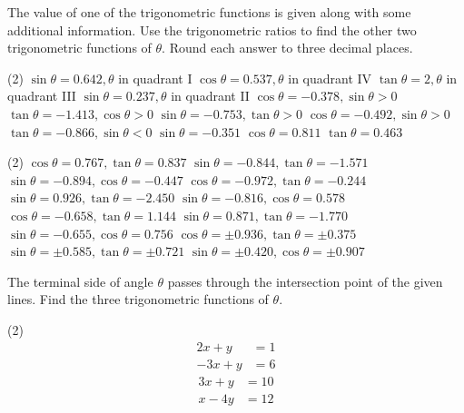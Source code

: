 \documentclass[12pt,fleqn]{book}
\newcommand{\prb}[1]{\begin{Exercise}\parbox[t]{\textwidth-5em}{#1}\end{Exercise}}
\newcommand{\sol}[1]{\begin{Answer}\parbox[t]{\textwidth-5em}{#1}\end{Answer}}
\begin{document}
\prb{
	The value of one of the trigonometric functions is given along with some additional information. Use the trigonometric ratios to find the other two trigonometric functions of $\theta$. Round each answer to three decimal places.
	\begin{tasks}(2)
		\task $\sin \theta=0.642, \theta$ in quadrant I
		\vspace{4em}
		\task $\cos \theta=0.537, \theta$ in quadrant IV
		\vspace{4em}
		\task $\tan \theta=2, \theta$ in quadrant III
		\vspace{4em}
		\task $\sin \theta=0.237, \theta$ in quadrant II
		\vspace{4em}
		\task $\cos \theta=-0.378, \sin \theta>0$
		\vspace{4em}
		\task $\tan \theta=-1.413, \cos \theta>0$
		\vspace{4em}
		\task $\sin \theta=-0.753, \tan \theta>0$
		\vspace{4em}
		\task $\cos \theta=-0.492, \sin \theta>0$
		\vspace{4em}
		\task $\tan \theta=-0.866, \sin \theta<0$
		\vspace{4em}
		\task $\sin \theta=-0.351$
		\vspace{4em}
		\task $\cos \theta=0.811$
		\vspace{4em}
		\task $\tan \theta=0.463$
		\vspace{4em}
	\end{tasks}
}
\sol{
	\begin{tasks}(2)
		\task $\cos \theta=0.767, \tan \theta=0.837$
		\task $\sin \theta=-0.844, \tan \theta=-1.571$
		\task $\sin \theta=-0.894, \cos \theta=-0.447$
		\task $\cos \theta=-0.972, \tan \theta=-0.244$
		\task $\sin \theta=0.926, \tan \theta=-2.450$
		\task $\sin \theta=-0.816, \cos \theta=0.578$
		\task $\cos \theta=-0.658, \tan \theta=1.144$
		\task $\sin \theta=0.871, \tan \theta=-1.770$
		\task $\sin \theta=-0.655, \cos \theta=0.756$
		\task $\cos \theta=\pm 0.936, \tan \theta=\pm 0.375$
		\task $\sin \theta=\pm 0.585, \tan \theta=\pm 0.721$
		\task $\sin \theta=\pm 0.420, \cos \theta=\pm 0.907$
	\end{tasks}
}
\prb{
	The terminal side of angle $\theta$ passes through the intersection point of the given lines. Find the three trigonometric functions of $\theta$.
	\begin{tasks}(2)
		\task \vspace{-2.1em}
		\begin{align*}
			2 x+y  & =1 \\
			-3 x+y & =6
		\end{align*}
		\task \vspace{-2.1em}
		\begin{align*}
			3 x+y & =10 \\
			x-4 y & =12
		\end{align*}
		\vspace{5em}
	\end{tasks}
}
\end{document}
